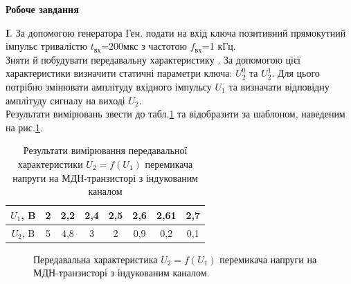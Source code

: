 \documentclass[a4paper,14pt]{extreport}
\begin{document}
\begin{center}
\textbf{Робоче завдання}
\end{center}

\textbf{I}. За допомогою генератора Ген. подати на вхід ключа позитивний прямокутний імпульс тривалістю $t_{\text{вх}}$=200мкс з частотою $f_{\text{вх}}$=1 кГц. \\

Зняти й побудувати передавальну характеристику . За допомогою цієї характеристики визначити статичні параметри ключа:  $U_2^0$ та $U_2^1$. Для цього потрібно змінювати амплітуду вхідного імпульсу $U_1$ та визначати відповідну амплітуду сигналу на виході $U_2$. \\

Результати вимірювань звести до табл.\ref{tab3}  та відобразити за шаблоном, наведеним на рис.\ref{ris3}.

\begin{table}[h!]
	\begin{center}
		\begin{tabular}{|c|c|c|c|c|c|c|c|}
			\hline
			$U_1$, B & 2 & 2,2 & 2,4 & 2,5 & 2,6 & 2,61 & 2,7 \\ \hline
			$U_2$, B & 5 & 4,8 & 3 & 2 & 0,9 & 0,2 & 0,1 \\ \hline
		\end{tabular}
	
		\caption{Результати вимірювання передавальної характеристики $U_2 = f(U_1)$ перемикача напруги на МДН-транзисторі з індукованим каналом}
		\label{tab3}

	\end{center}
\end{table}

 
\begin{figure}[h!]
	\caption{Передавальна характеристика $U_2 = f(U_1)$ перемикача напруги на МДН-транзисторі з індукованим каналом.}
	\label{ris3}
\end{figure}
\end{document}
